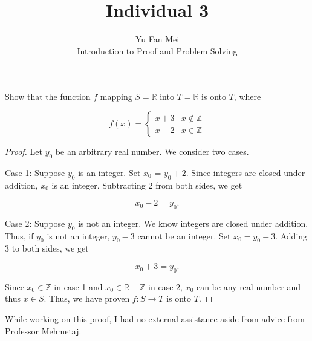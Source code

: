 \documentclass[12pt]{article}
\newenvironment{problem}[2][Problem]{\begin{trivlist}
\item[\hskip \labelsep {\bfseries #1}\hskip \labelsep {\bfseries #2.}]}{\end{trivlist}}
\begin{document}
 
 
\title{Individual 3}%
\author{Yu Fan Mei\\ %
Introduction to Proof and Problem Solving} %
 
\maketitle
 
\begin{problem}{18} %
Show that the function $f$ mapping $S = \mathbb{R}$ into $T = \mathbb{R}$ is onto $T$, where

$$f(x) = \begin{cases} x+3 & x \not\in \mathbb{Z} \\
    x-2 & x \in \mathbb{Z} \end{cases} $$

\end{problem}
 
\begin{proof} Let $y_0$ be an arbitrary real number. We consider two cases. 

\noindent Case 1: Suppose $y_0$ is an integer. Set $x_0$ = $y_0 + 2$. Since integers are closed under addition, $x_0$ is an integer. Subtracting $2$ from both sides, we get

$$x_0 - 2 = y_0.$$

\noindent Case 2: Suppose $y_0$ is not an integer. We know integers are closed under addition. Thus, if $y_0$ is not an integer, $y_0 - 3$ cannot be an integer. Set $x_0 = y_0 - 3$. Adding 3 to both sides, we get 

$$x_0 + 3 = y_0.$$

Since $x_0 \in \mathbb{Z}$ in case 1 and $x_0 \in \mathbb{R} - \mathbb{Z}$ in case 2, $x_0$ can be any real number and thus $x \in S$. Thus, we have proven $f : S \to T$ is onto $T$.


\end{proof}

While working on this proof, I had no external assistance aside from advice from Professor Mehmetaj.
 
\end{document}
